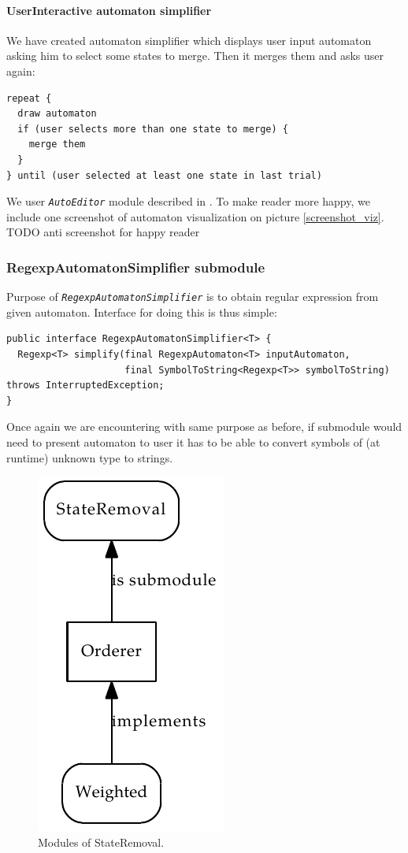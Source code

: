 \documentclass[a4paper,10pt,oneside]{article}
\newcommand{\myscale}{0.74}
\newcommand{\code}[1]{\texttt{\StrSubstitute{#1}{.}{.\.}}}
\def\.{\discretionary{}{}{}}
\newcommand{\jmodule}[1]{\texttt{\textit{#1}}}
\begin{document}
\paragraph{UserInteractive automaton simplifier}
We have created automaton simplifier which displays user input automaton asking him to select some states to merge.
Then it merges them and asks user again:
\begin{verbatim}
repeat {
  draw automaton
  if (user selects more than one state to merge) {
    merge them
  }
} until (user selected at least one state in last trial)
\end{verbatim}
We user \jmodule{AutoEditor} module described in \cite{autoeditordoc}.
To make reader more happy, we include one screenshot of automaton visualization on picture \ref{screenshot_viz}.
TODO anti screenshot for happy reader

\subsubsection{RegexpAutomatonSimplifier submodule}
Purpose of \jmodule{RegexpAutomatonSimplifier} is to obtain regular expression from given automaton.
Interface for doing this is thus simple:
\begin{verbatim}
public interface RegexpAutomatonSimplifier<T> {
  Regexp<T> simplify(final RegexpAutomaton<T> inputAutomaton, 
                     final SymbolToString<Regexp<T>> symbolToString) throws InterruptedException;
}
\end{verbatim}
Once again we are encountering \code{symbolToString} with same purpose as before, if submodule would need to present automaton to user
it has to be able to convert symbols of (at runtime) unknown type to strings.

\begin{figure}
	\centering\includegraphics[scale=\myscale]{state_removal_modules}
	\caption{Modules of StateRemoval.} \label{state_removal_modules}
\end{figure}
\end{document}
